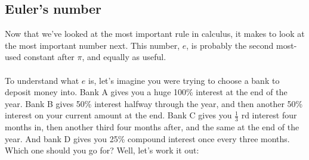 \documentclass[11pt, leqno]{article}
\numberwithin{equation}{section}
\begin{document}
\subsection{Euler's number}
Now that we've looked at the most important rule in calculus, it makes to look at the most important number next. This number, $e$, is probably the second most-used constant after $\pi$, and equally as useful. 
\\ \\ To understand what $e$ is, let's imagine you were trying to choose a bank to deposit money into. Bank A gives you a huge 100\% interest at the end of the year. Bank B gives 50\% interest halfway through the year, and then another 50\% interest on your current amount at the end. Bank C gives you $\frac{1}{3}$ rd interest four months in, then another third four months after, and the same at the end of the year. And bank D gives you 25\% compound interest once every three months. Which one should you go for? Well, let's work it out:
\end{document}
